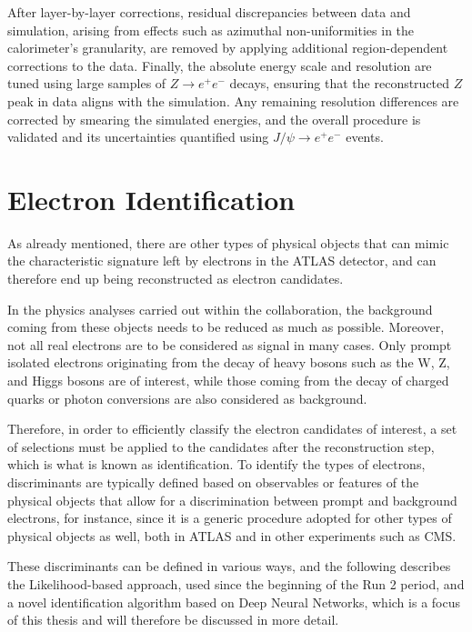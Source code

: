 After layer-by-layer corrections, residual discrepancies between data and simulation, arising from effects such as azimuthal non-uniformities in the calorimeter's granularity, are removed by applying additional region-dependent corrections to the data. Finally, the absolute energy scale and resolution are tuned using large samples of \(Z\to e^+e^-\) decays, ensuring that the reconstructed \(Z\) peak in data aligns with the simulation. Any remaining resolution differences are corrected by smearing the simulated energies, and the overall procedure is validated and its uncertainties quantified using \(J/\psi\to e^+e^-\) events.  


\section{Electron Identification}

As already mentioned, there are other types of physical objects that can mimic the characteristic signature left by electrons in the ATLAS detector, and can therefore end up being reconstructed as electron candidates. 

In the physics analyses carried out within the collaboration, the background coming from these objects needs to be reduced as much as possible. Moreover, not all real electrons are to be considered as signal in many cases. Only prompt isolated electrons originating from the decay of heavy bosons such as the W, Z, and Higgs bosons are of interest, while those coming from the decay of charged quarks or photon conversions are also considered as background.

Therefore, in order to efficiently classify the electron candidates of interest, a set of selections must be applied to the candidates after the reconstruction step, which is what is known as identification. To identify the types of electrons, discriminants are typically defined based on observables or features of the physical objects that allow for a discrimination between prompt and background electrons, for instance, since it is a generic procedure adopted for other types of physical objects as well, both in ATLAS and in other experiments such as CMS.

These discriminants can be defined in various ways, and the following describes the Likelihood-based approach, used since the beginning of the Run 2 period, and a novel identification algorithm based on Deep Neural Networks, which is a focus of this thesis and will therefore be discussed in more detail.


